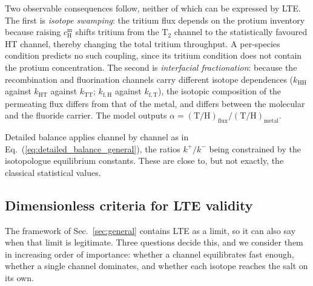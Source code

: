 \documentclass[5p]{elsarticle}
\newcommand{\cm}[1]{c^{\mathrm{m}}_{#1}}   %
\begin{document}
Two observable consequences follow, neither of which can be expressed by LTE.
The first is \emph{isotope swamping}: the tritium flux depends on the protium inventory because raising $\cm{\mathrm{H}}$ shifts tritium from the $\mathrm{T_2}$ channel to the statistically favoured HT channel, thereby changing the total tritium throughput.
A per-species condition predicts no such coupling, since its tritium condition does not contain the protium concentration.
The second is \emph{interfacial fractionation}: because the recombination and fluorination channels carry different isotope dependences ($k_\mathrm{HH}$ against $k_\mathrm{HT}$ against $k_\mathrm{TT}$; $k_\mathrm{f,H}$ against $k_\mathrm{f,T}$), the isotopic composition of the permeating flux differs from that of the metal, and differs between the molecular and the fluoride carrier. 
The model outputs $\alpha = (\mathrm{T/H})_\mathrm{flux} / (\mathrm{T/H})_\mathrm{metal}$.

Detailed balance applies channel by channel as in Eq.~(\ref{eq:detailed_balance_general}), the ratios $k^{+}/k^{-}$ being constrained by the isotopologue equilibrium constants. 
These are close to, but not exactly, the classical statistical values.

\subsection{Dimensionless criteria for LTE validity}
\label{sec:damkohler}

The framework of Sec.~\ref{sec:general} contains LTE as a limit, so it can also say when that limit is legitimate. 
Three questions decide this, and we consider them in increasing order of importance: whether a channel equilibrates fast enough, whether a single channel dominates, and whether each isotope reaches the salt on its own.
\end{document}
